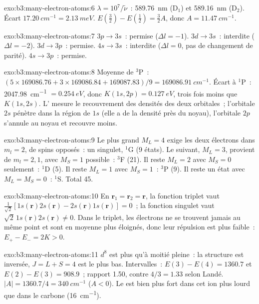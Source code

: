 \begin{solution}{exo:b3:many-electron-atoms:6}
$\lambda = 10^7/\tilde\nu$~: \qty{589.76}{nm} (D$_1$) et \qty{589.16}{nm}
(D$_2$). Écart $\qty{17.20}{cm^{-1}} = \qty{2.13}{meV}$. $E(\frac32) -
E(\frac12) = \frac32A$, donc $A = \qty{11.47}{cm^{-1}}$.
\end{solution}

\begin{solution}{exo:b3:many-electron-atoms:7}
$3p \to 3s$~: permise ($\Delta l = -1$). $3d \to 3s$~: interdite ($\Delta l = -2$).
$3d \to 3p$~: permise. $4s \to 3s$~: interdite ($\Delta l = 0$, pas de
changement de parité). $4s \to 3p$~: permise.
\end{solution}

\begin{solution}{exo:b3:many-electron-atoms:8}
Moyenne de ${}^3$P~: $(5 \times 169086.76 + 3 \times 169086.84 + 169087.83)/9 =
\qty{169086.91}{cm^{-1}}$. Écart à ${}^1$P~: \qty{2047.98}{cm^{-1}} $=
\qty{0.254}{eV}$, donc $K(1s,2p) = \qty{0.127}{eV}$, trois fois moins que
$K(1s,2s)$. L' mesure le recouvrement des densités des
deux orbitales~; l'orbitale $2s$ pénètre dans la région de $1s$ (elle a
de la densité près du noyau), l'orbitale $2p$ s'annule au noyau et
recouvre moins.
\end{solution}

\begin{solution}{exo:b3:many-electron-atoms:9}
Le plus grand $M_L = 4$ exige les deux électrons dans $m_l = 2$, de spins
opposés~: un singulet, ${}^1$G (9 états). Le suivant, $M_L = 3$, provient
de $m_l = 2, 1$, avec
$M_S = 1$ possible~: ${}^3$F (21). Il reste $M_L = 2$ avec $M_S = 0$
seulement~:
${}^1$D (5). Il reste $M_L = 1$ avec $M_S = 1$~: ${}^3$P (9). Il reste un
état avec
$M_L = M_S = 0$~: ${}^1$S. Total 45.
\end{solution}

\begin{solution}{exo:b3:many-electron-atoms:10}
En $\mathbf r_1 = \mathbf r_2 = \mathbf r$, la fonction triplet vaut
$\frac{1}{\sqrt2}[1s(\mathbf r)2s(\mathbf r) - 2s(\mathbf r)1s(\mathbf r)] = 0$~; la
fonction singulet vaut $\sqrt2\,1s(\mathbf r)2s(\mathbf r) \ne 0$. Dans
le triplet, les électrons ne se trouvent jamais au même point et sont en
moyenne plus éloignés, donc leur répulsion est plus faible~:
$E_+ - E_- = 2K > 0$.
\end{solution}

\begin{solution}{exo:b3:many-electron-atoms:11}
$d^8$ est plus qu'à moitié pleine~: la structure est inversée,
$J = L + S = 4$ est le plus bas. Intervalles~: $E(3) - E(4) = 1360.7$ et
$E(2) - E(3) = 908.9$~; rapport
1.50, contre $4/3 = 1.33$ selon Landé. $|A| = 1360.7/4 = \qty{340}{cm^{-1}}$
($A < 0$). Le  est bien plus fort dans cet ion plus
lourd que dans le carbone (\qty{16}{cm^{-1}}).
\end{solution}


